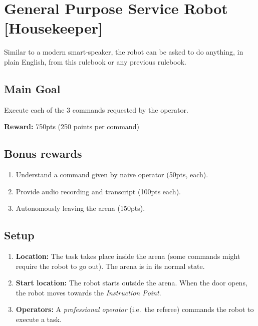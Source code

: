 \section{General Purpose Service Robot [Housekeeper]}
Similar to a modern smart-speaker, the robot can be asked to do anything, in plain English, from this rulebook or any previous rulebook.


\subsection*{Main Goal}
Execute each of the 3 commands requested by the operator.

\noindent\textbf{Reward:} 750pts (250 points per command)\\

\subsection*{Bonus rewards}
\begin{enumerate}[nosep]
	\item Understand a command given by naive operator (50pts, each).
	\item Provide audio recording and transcript (100pts each).
	\item Autonomously leaving the arena (150pts).
\end{enumerate}

%
%
\subsection*{Setup}
\begin{enumerate}[nosep]
	\item \textbf{Location:} The task takes place inside the arena (some commands might require the robot to go out). The arena is in its normal state.

	\item \textbf{Start location:} The robot starts outside the arena. When the door opens, the robot moves towards the \textit{Instruction Point}.

	\item \textbf{Operators:} A \emph{professional operator} (i.e.~the referee) commands the robot to execute a task.
\end{enumerate}


